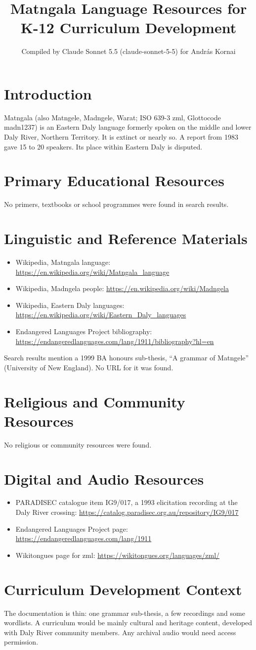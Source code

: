 \documentclass[12pt]{article}
\title{Matngala Language Resources for K-12 Curriculum Development}
\author{Compiled by Claude Sonnet 5.5 (claude-sonnet-5-5) for Andr\'as Kornai}
\date{}
\begin{document}
\maketitle

\section{Introduction}
Matngala (also Matngele, Madngele, Warat; ISO 639-3 zml, Glottocode madn1237) is an Eastern Daly language formerly spoken on the middle and lower Daly River, Northern Territory. It is extinct or nearly so. A report from 1983 gave 15 to 20 speakers. Its place within Eastern Daly is disputed.

\section{Primary Educational Resources}
No primers, textbooks or school programmes were found in search results.

\section{Linguistic and Reference Materials}
\begin{itemize}
\item Wikipedia, Matngala language: \url{https://en.wikipedia.org/wiki/Matngala_language}
\item Wikipedia, Madngela people: \url{https://en.wikipedia.org/wiki/Madngela}
\item Wikipedia, Eastern Daly languages: \url{https://en.wikipedia.org/wiki/Eastern_Daly_languages}
\item Endangered Languages Project bibliography: \url{https://endangeredlanguages.com/lang/1911/bibliography?hl=en}
\end{itemize}
Search results mention a 1999 BA honours sub-thesis, ``A grammar of Matngele'' (University of New England). No URL for it was found.

\section{Religious and Community Resources}
No religious or community resources were found.

\section{Digital and Audio Resources}
\begin{itemize}
\item PARADISEC catalogue item IG9/017, a 1993 elicitation recording at the Daly River crossing: \url{https://catalog.paradisec.org.au/repository/IG9/017}
\item Endangered Languages Project page: \url{https://endangeredlanguages.com/lang/1911}
\item Wikitongues page for zml: \url{https://wikitongues.org/languages/zml/}
\end{itemize}

\section{Curriculum Development Context}
The documentation is thin: one grammar sub-thesis, a few recordings and some wordlists. A curriculum would be mainly cultural and heritage content, developed with Daly River community members. Any archival audio would need access permission.
\end{document}
